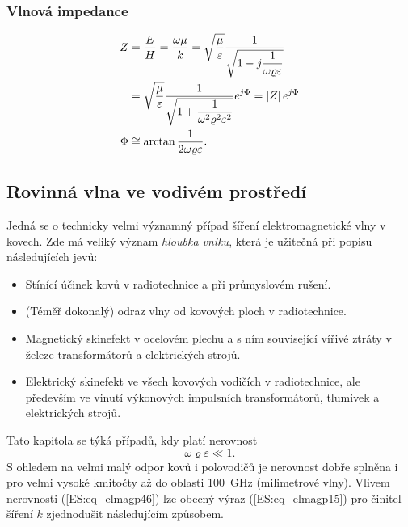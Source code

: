     \subsubsection{Vlnová impedance}
    \begin{subequations}
      \begin{align}
           Z &= \frac{E}{H} = \frac{\omega\mu}{k} 
              = \sqrt{\frac{\mu}{\varepsilon}}                             
                     \frac{1}{\sqrt{1 - j\dfrac{1}{\omega\varrho\varepsilon}}}    \nonumber \\
             &= \sqrt{\frac{\mu}{\varepsilon}}           
                     \frac{1}{\sqrt{1 + 
                        \dfrac{1}{\omega^2\varrho^2\varepsilon^2}}}e^{j\Phi} 
              = \left\lvert Z\right\rvert e^{j\Phi}                                   \label{ES:eq_elmagp46a}  \\
        \Phi &\cong \arctan\frac{1}{2\omega\varrho\varepsilon}.    \label{ES:eq_elmagp46b}
    \end{align}
    \end{subequations}

    \subsection{Rovinná vlna ve vodivém prostředí}
      Jedná se o technicky velmi významný případ šíření elektromagnetické vlny v kovech. Zde má 
      veliký význam \emph{hloubka vniku}, která je užitečná při popisu následujících jevů:
      \begin{itemize}[noitemsep]
        \item Stínící účinek kovů v radiotechnice a při průmyslovém rušení.
        \item (Téměř dokonalý) odraz vlny od kovových ploch v radiotechnice.
        \item Magnetický skinefekt v ocelovém plechu a s ním související vířivé ztráty v železe 
              transformátorů a elektrických strojů.
        \item Elektrický skinefekt ve všech kovových vodičích v radiotechnice, ale především ve 
              vinutí výkonových impulsních transformátorů, tlumivek a elektrických strojů.
     \end{itemize}
     Tato kapitola se týká případů, kdy platí nerovnost
     \begin{equation}\label{ES:eq_elmagp46}
       \omega\varrho\varepsilon \ll 1.
     \end{equation}
     S ohledem na velmi malý odpor kovů i polovodičů je nerovnost dobře splněna i pro velmi 
     vysoké kmitočty až do oblasti \SI{100}{\GHz} (milimetrové vlny). Vlivem nerovnosti 
     (\ref{ES:eq_elmagp46}) lze obecný výraz (\ref{ES:eq_elmagp15}) pro činitel šíření \(k\) 
     zjednodušit následujícím způsobem.
     
